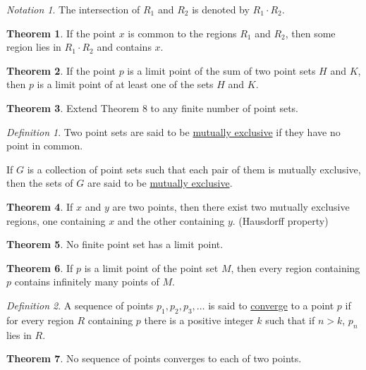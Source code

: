 \documentclass[12pt, oneside, letter] {amsart}
\theoremstyle {definition}
\newtheorem {thm} {Theorem}
\theoremstyle {remark}
\newtheorem* {defn} {Definition}
\newtheorem* {note} {Notation}
\begin{document}
\begin{note}
  The intersection of $R_1$ and $R_2$ is denoted by $R_1 \cdot R_2$.
\end{note}

\begin{thm}
  If the point $x$ is common to the regions $R_1$ and $R_2$, then some
  region lies in $R_1 \cdot R_2$ and contains $x$.
\end{thm}

\begin{thm}
  If the point $p$ is a limit point of the sum of two point sets $H$
  and $K$, then $p$ is a limit point of at least one of the sets $H$
  and $K$.
\end{thm}

\begin{thm}
  Extend Theorem 8 to any finite number of point sets.
\end{thm}

\begin{defn}
  Two point sets are said to be \underline {mutually exclusive} if
  they have no point in common.
  
  If $G$ is a collection of point sets such that each pair of them is
  mutually exclusive, then the sets of $G$ are said to be \underline
  {mutually exclusive}.
\end{defn}

\begin{thm}
  If $x$ and $y$ are two points, then there exist two mutually
  exclusive regions, one containing $x$ and the other containing $y$.
  (Hausdorff property)
\end{thm}

\begin{thm}
  No finite point set has a limit point.
\end{thm}

\begin{thm}
  If $p$ is a limit point of the point set $M$, then every region
  containing $p$ contains infinitely many points of $M$.
\end{thm}

\begin{defn}
  A sequence of points $p_1, p_2, p_3, \dots$ is said to \underline
  {converge} to a point $p$ if for every region $R$ containing $p$
  there is a positive integer $k$ such that if $n > k$, $p_n$ lies in
  $ R$.
\end{defn}

\begin{thm}
  No sequence of points converges to each of two points.
\end{thm}
\end{document}
